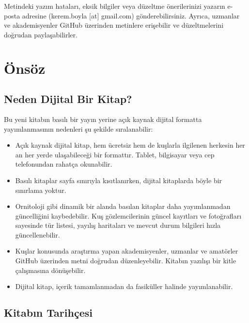 \documentclass[
  a4paper,
  DIV=11,
  numbers=noendperiod]{scrartcl}
\begin{document}
Metindeki yazım hataları, eksik bilgiler veya düzeltme önerilerinizi
yazarın e-posta adresine (kerem.boyla {[}at{]} gmail.com)
gönderebilirsiniz. Ayrıca, uzmanlar ve akademisyenler GitHub üzerinden
metinlere erişebilir ve düzeltmelerini doğrudan paylaşabilirler.


\chapter*{Önsöz}\label{uxf6nsuxf6z}


\section*{Neden Dijital Bir Kitap?}\label{neden-dijital-bir-kitap}


Bu yeni kitabın basılı bir yayın yerine açık kaynak dijital formatta
yayımlanmasının nedenleri şu şekilde sıralanabilir:

\begin{itemize}
\item
  Açık kaynak dijital kitap, hem ücretsiz hem de kuşlarla ilgilenen
  herkesin her an her yerde ulaşabileceği bir formattır. Tablet,
  bilgisayar veya cep telefonundan rahatça okunabilir.
\item
  Basılı kitaplar sayfa sınırıyla kısıtlanırken, dijital kitaplarda
  böyle bir sınırlama yoktur.
\item
  Ornitoloji gibi dinamik bir alanda basılan kitaplar daha yayımlanmadan
  güncelliğini kaybedebilir. Kuş gözlemcilerinin güncel kayıtları ve
  fotoğrafları sayesinde tür listesi, yayılış haritaları ve mevcut durum
  bilgileri hızla güncellenebilir.
\item
  Kuşlar konusunda araştırma yapan akademisyenler, uzmanlar ve amatörler
  GitHub üzerinden metni doğrudan düzenleyebilir. Kitabın yazılışı bir
  kitle çalışmasına dönüşebilir.
\item
  Dijital kitap, içerik tamamlanmadan da fasiküller halinde
  yayımlanabilir.
\end{itemize}

\section*{Kitabın Tarihçesi}\label{kitabux131n-tarihuxe7esi}
\end{document}
